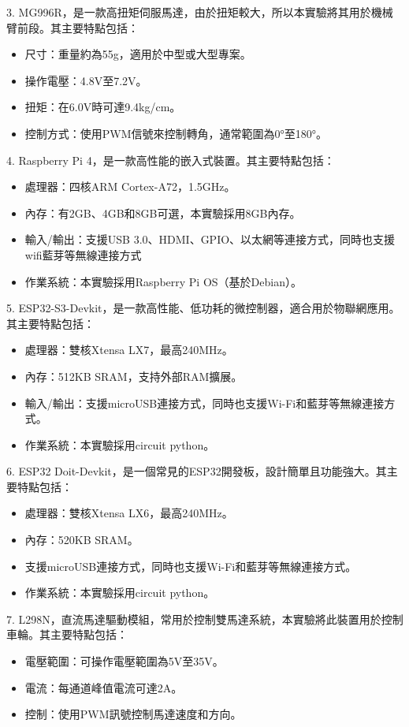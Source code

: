\documentclass[class=NCU_thesis, crop=false]{standalone}
\begin{document}
3. MG996R，是一款高扭矩伺服馬達，由於扭矩較大，所以本實驗將其用於機械臂前段。其主要特點包括：
\begin{itemize}
	\item 尺寸：重量約為55g，適用於中型或大型專案。
	\item 操作電壓：4.8V至7.2V。
	\item 扭矩：在6.0V時可達9.4kg/cm。
	\item 控制方式：使用PWM信號來控制轉角，通常範圍為0°至180°。
\end{itemize}

4. Raspberry Pi 4，是一款高性能的嵌入式裝置。其主要特點包括：
\begin{itemize}
	\item 處理器：四核ARM Cortex-A72，1.5GHz。
	\item 內存：有2GB、4GB和8GB可選，本實驗採用8GB內存。
	\item 輸入/輸出：支援USB 3.0、HDMI、GPIO、以太網等連接方式，同時也支援wifi藍芽等無線連接方式
	\item 作業系統：本實驗採用Raspberry Pi OS（基於Debian）。
\end{itemize}

5. ESP32-S3-Devkit，是一款高性能、低功耗的微控制器，適合用於物聯網應用。其主要特點包括：
\begin{itemize}
	\item 處理器：雙核Xtensa LX7，最高240MHz。
	\item 內存：512KB SRAM，支持外部RAM擴展。
	\item 輸入/輸出：支援microUSB連接方式，同時也支援Wi-Fi和藍芽等無線連接方式。
	\item 作業系統：本實驗採用circuit python。
\end{itemize}

6. ESP32 Doit-Devkit，是一個常見的ESP32開發板，設計簡單且功能強大。其主要特點包括：
\begin{itemize}
	\item 處理器：雙核Xtensa LX6，最高240MHz。
	\item 內存：520KB SRAM。
	\item 支援microUSB連接方式，同時也支援Wi-Fi和藍芽等無線連接方式。
	\item 作業系統：本實驗採用circuit python。
\end{itemize}

7. L298N，直流馬達驅動模組，常用於控制雙馬達系統，本實驗將此裝置用於控制車輪。其主要特點包括：
\begin{itemize}
	\item 電壓範圍：可操作電壓範圍為5V至35V。
	\item 電流：每通道峰值電流可達2A。
	\item 控制：使用PWM訊號控制馬達速度和方向。
\end{itemize}
\end{document}

